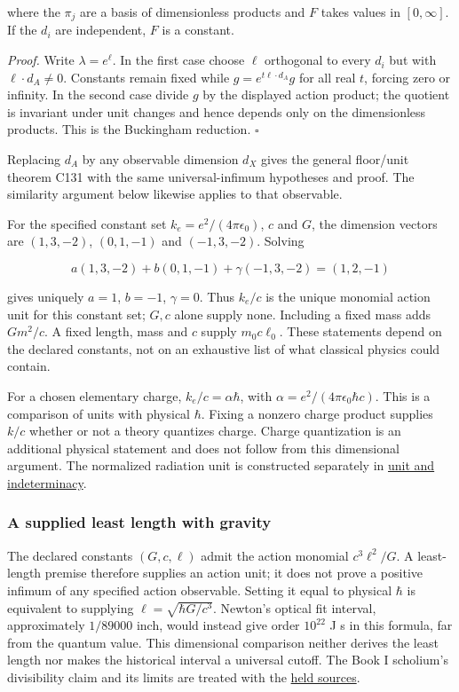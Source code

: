 \documentclass[11pt,a4paper]{article}
\begin{document}
where the \(\pi_j\) are a basis of dimensionless products and \(F\)
takes values in \([0,\infty]\). If the \(d_i\) are independent, \(F\) is
a constant.

\emph{Proof.} Write \(\lambda=e^\ell\). In the first case choose
\(\ell\) orthogonal to every \(d_i\) but with \(\ell\cdot d_A\ne0\).
Constants remain fixed while \(g=e^{t\ell\cdot d_A}g\) for all real
\(t\), forcing zero or infinity. In the second case divide \(g\) by the
displayed action product; the quotient is invariant under unit changes
and hence depends only on the dimensionless products. This is the
Buckingham reduction. \(\square\)

Replacing \(d_A\) by any observable dimension \(d_X\) gives the general
floor/unit theorem C131 with the same universal-infimum hypotheses and
proof. The similarity argument below likewise applies to that
observable.

For the specified constant set \(k_e=e^2/(4\pi\epsilon_0)\), \(c\) and
\(G\), the dimension vectors are \((1,3,-2)\), \((0,1,-1)\) and
\((-1,3,-2)\). Solving

\[a(1,3,-2)+b(0,1,-1)+\gamma(-1,3,-2)=(1,2,-1)\]

gives uniquely \(a=1\), \(b=-1\), \(\gamma=0\). Thus \(k_e/c\) is the
unique monomial action unit for this constant set; \(G,c\) alone supply
none. Including a fixed mass adds \(Gm^2/c\). A fixed length, mass and
\(c\) supply \(m_0c\ell_0\). These statements depend on the declared
constants, not on an exhaustive list of what classical physics could
contain.

For a chosen elementary charge, \(k_e/c=\alpha\hbar\), with
\(\alpha=e^2/(4\pi\epsilon_0\hbar c)\). This is a comparison of units
with physical \(\hbar\). Fixing a nonzero charge product supplies
\(k/c\) whether or not a theory quantizes charge. Charge quantization is
an additional physical statement and does not follow from this
dimensional argument. The normalized radiation unit is constructed
separately in \href{necessity-unit-and-indeterminacy.md}{unit and
indeterminacy}.

\hypertarget{a-supplied-least-length-with-gravity}{%
\subsubsection{A supplied least length with
gravity}\label{a-supplied-least-length-with-gravity}}

The declared constants \((G,c,\ell)\) admit the action monomial
\(c^3\ell^2/G\). A least-length premise therefore supplies an action
unit; it does not prove a positive infimum of any specified action
observable. Setting it equal to physical \(\hbar\) is equivalent to
supplying \(\ell=\sqrt{\hbar G/c^3}\). Newton's optical fit interval,
approximately \(1/89000\) inch, would instead give order \(10^{22}\) J s
in this formula, far from the quantum value. This dimensional comparison
neither derives the least length nor makes the historical interval a
universal cutoff. The Book I scholium's divisibility claim and its
limits are treated with the \href{planck-gap-paper.md}{held sources}.
\end{document}
